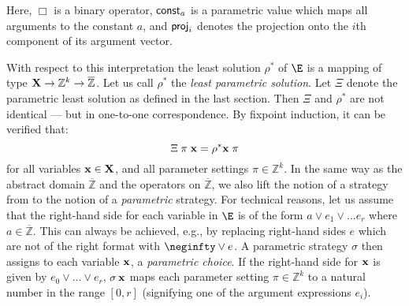 \documentclass[a4paper]{easychair}
\newcommand{\ZZ}{\mathbb{Z}}
\newcommand{\ZzZ}{\overline{\mathbb Z}}
\begin{document}
\noindent
Here, $\Box$ is a binary operator,
${\sf const}_a$ is a parametric value which maps all arguments to the constant $a$,
and ${\sf proj}_i$ denotes the projection onto the $i$th component of its argument vector.

With respect to this interpretation the least solution $\rho^*$ of $\E$ is a mapping of type
${\bf X}\to\ZZ^k\to\ZzZ$. Let us call $\rho^*$ the \emph{least parametric solution}.
Let $\Xi$ denote the parametric least solution as defined in the last section. Then $\Xi$ and $\rho^*$
are not identical --- but in one-to-one correspondence. By fixpoint induction, it can be verified that:
\[
\Xi\;\pi\;{\bf x} = \rho^*{\bf x}\;\pi 
\]
for all variables ${\bf x}\in{\bf X}$, and all parameter settings $\pi\in\ZZ^k$.
In the same way as the abstract domain ${\ZzZ}$ and the operators on ${\ZzZ}$,
we also lift the notion of a strategy from \cite{DBLP:conf/fm/GawlitzaS08}  to the notion of a 
\emph{parametric} strategy.
For technical reasons, let us assume that the right-hand side for each variable in $\E$
is of the form $a\vee e_1\vee\ldots e_r$ where $a\in\ZzZ$. This can always be achieved, e.g., 
by replacing right-hand sides $e$ which are not of the right format with $\neginfty\vee e$.
A parametric strategy $\sigma$ then assigns to each variable ${\bf x}$, a \emph{parametric choice}.
If the right-hand side for ${\bf x}$ is given by $e_0\vee\ldots\vee e_r$,
$\sigma\,{\bf x}$ maps each parameter setting $\pi\in\ZZ^k$ 
to a natural number in the range $[0,r]$ (signifying one of the argument expressions $e_i$).
\end{document}
